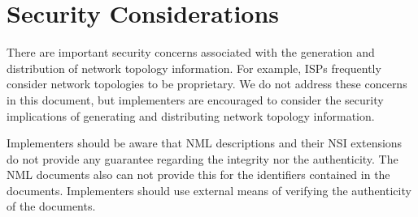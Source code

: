 
\section{Security Considerations}%
\label{s:security}

% 
% 

There are important security concerns associated with the generation and distribution of network topology information. For example, ISPs frequently consider network topologies to be proprietary. We do not address these concerns in this document, but implementers are encouraged to consider the security implications of generating and distributing network topology information. 

Implementers should be aware that NML descriptions and their NSI extensions do not provide any guarantee regarding the integrity nor the authenticity. The NML documents also can not provide this for the identifiers contained in the documents. Implementers should use external means of verifying the authenticity of the documents.